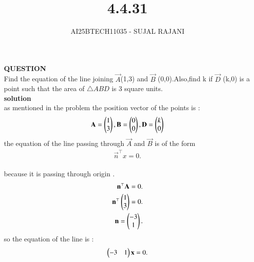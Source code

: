 \documentclass[journal,12pt,onecolumn]{IEEEtran}
\begin{document}
\title{4.4.31}
\author{AI25BTECH11035 - SUJAL RAJANI}
{\let\newpage\relax\maketitle}
\textbf{QUESTION}
\\
Find the equation of the line joining $\vec{A}$(1,3) and $\vec{B}$ (0,0).Also,find k if $\vec{D}$ (k,0) is a point such that the area of $\triangle ABD$ is 3 square units.
\\
\textbf{solution}
\\
as mentioned in the problem the position vector of the points is :
\\
\begin{align*}
    \mathbf{A}=\begin{pmatrix}1\\3\end{pmatrix},\mathbf{B}=\begin{pmatrix}0\\0\end{pmatrix},\mathbf{D}=\begin{pmatrix}k\\0\end{pmatrix}
\end{align*}
the equation of the line passing through $\vec{A}$ and $\vec{B}$ is of the form 
\begin{align*}
    \vec{n}^\top x=0 .
\end{align*}
\\ 
because it is passing through origin .
\\
\begin{align*}
      \mathbf{n}^\top \mathbf{A}=0.
      \\
      \mathbf{n}^\top \begin{pmatrix}1\\3\end{pmatrix}=0.
            \\
     \mathbf{n}=\begin{pmatrix}-3\\1\end{pmatrix}  .      
\end{align*}
so the equation of the line is :
\\
\begin{align*}
    \begin{pmatrix}-3&1\end{pmatrix} \mathbf{x}=0 .
\end{align*}
\\
\end{document}
